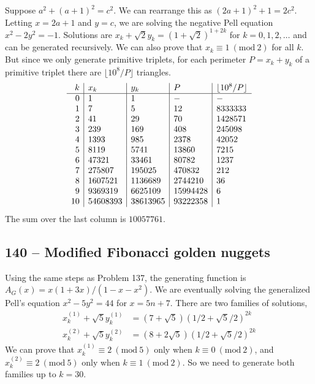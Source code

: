 \documentclass{article}
\newcommand{\Mod}[1]{\ (\mathrm{mod}\ #1)}
\begin{document}
Suppose $a^2 + (a+1)^2 = c^2$.
We can rearrange this as $(2a+1)^2 + 1 = 2c^2$.
Letting $x = 2a+1$ and $y = c$, we are solving the negative Pell equation $x^2 - 2y^2 = -1$.
Solutions are $x_k + \sqrt{2} y_k = (1+\sqrt{2})^{1+2k}$ for $k = 0, 1, 2, \dotsc$ and can be generated recursively.
We can also prove that $x_k \equiv 1 \Mod{2}$ for all $k$.
But since we only generate primitive triplets, for each perimeter $P = x_k + y_k$ of a primitive triplet there are $\lfloor 10^8/P \rfloor$ triangles.
\begin{align*}
	\begin{array}{r | l | l | l | l }
	k & x_k & y_k & P & \lfloor 10^8 / P \rfloor \\ \hline
	0 & 1 & 1 & - & - \\
	1 & 7 & 5 & 12 & 8333333 \\
	2 & 41 & 29 & 70 & 1428571 \\
	3 & 239 & 169 & 408 & 245098 \\
	4 & 1393 & 985 & 2378 & 42052 \\
	5 & 8119 & 5741 & 13860 & 7215 \\
	6 & 47321 & 33461 & 80782 & 1237 \\
	7 & 275807 & 195025 & 470832 & 212 \\
	8 & 1607521 & 1136689 & 2744210 & 36 \\
	9 & 9369319 & 6625109 & 15994428 & 6 \\
	10 & 54608393 & 38613965 & 93222358 & 1  \\
	\end{array}
\end{align*}
The sum over the last column is $\boxed{10057761}$.


\subsection*{140 -- Modified Fibonacci golden nuggets}
Using the same steps as Problem 137, the generating function is $A_G(x) = x(1+3x)/(1-x-x^2)$.
We are eventually solving the generalized Pell's equation $x^2 - 5y^2 = 44$ for $x = 5n+7$.
There are two families of solutions,
\begin{align*}
	x_k^{(1)} + \sqrt{5} y_k^{(1)} &= (7 + \sqrt{5})(1/2 + \sqrt{5}/2)^{2k} \\
	x_k^{(2)} + \sqrt{5} y_k^{(2)} &= (8 + 2\sqrt{5})(1/2 + \sqrt{5}/2)^{2k}
\end{align*}
We can prove that $x_k^{(1)} \equiv 2 \Mod 5$ only when $k \equiv 0 \Mod 2$, and $x_k^{(2)} \equiv 2 \Mod 5$ only when $k \equiv 1 \Mod 2$.
So we need to generate both families up to $k=30$.
\end{document}
